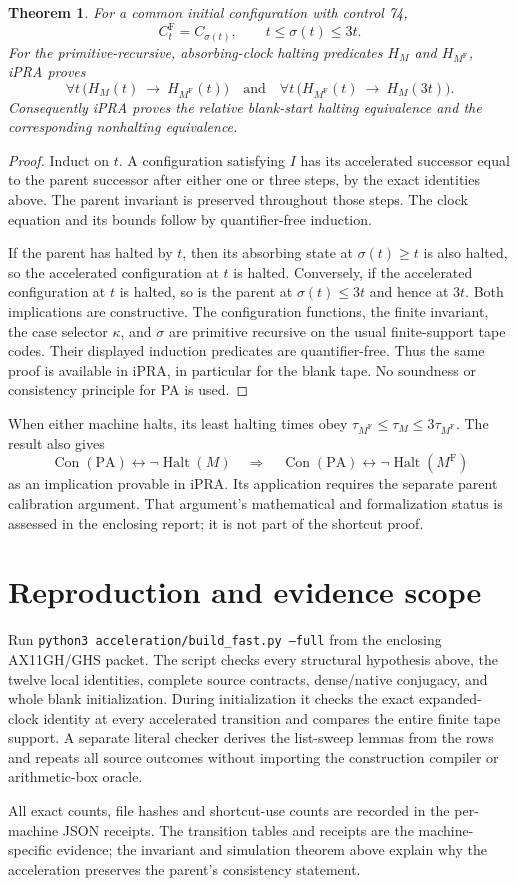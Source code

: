 \documentclass[11pt]{article}
\newtheorem{theorem}{Theorem}
\begin{document}
\begin{theorem}
For a common initial configuration with control 74,
\[
 C_t^{\mathrm F}=C_{\sigma(t)},\qquad
 t\leq\sigma(t)\leq3t.
\]
For the primitive-recursive, absorbing-clock halting predicates $H_M$ and
$H_{M^{\mathrm F}}$, iPRA proves
\[
 \forall t\,\bigl(H_M(t)\ \longrightarrow\ H_{M^{\mathrm F}}(t)\bigr)
 \quad\text{and}\quad
 \forall t\,\bigl(H_{M^{\mathrm F}}(t)\ \longrightarrow\ H_M(3t)\bigr).
\]
Consequently iPRA proves the relative blank-start halting equivalence and
the corresponding nonhalting equivalence.
\end{theorem}
\begin{proof}
Induct on $t$. A configuration satisfying $I$ has its accelerated successor
equal to the parent successor after either one or three steps, by the exact
identities above. The parent invariant is preserved throughout those steps.
The clock equation and its bounds follow by quantifier-free induction.

If the parent has halted by $t$, then its absorbing state at $\sigma(t)\geq t$
is also halted, so the accelerated configuration at $t$ is halted. Conversely,
if the accelerated configuration at $t$ is halted, so is the parent at
$\sigma(t)\leq3t$ and hence at $3t$. Both implications are constructive.
The configuration functions, the finite invariant, the case selector
$\kappa$, and $\sigma$ are primitive recursive on the usual finite-support
tape codes. Their displayed induction predicates are quantifier-free.
Thus the same proof is available in iPRA, in particular for the blank tape.
No soundness or consistency principle for PA is used.
\end{proof}

When either machine halts, its least halting times obey
$\tau_{M^{\mathrm F}}\leq\tau_M\leq3\tau_{M^{\mathrm F}}$.
The result also gives
\[
 \operatorname{Con}(\mathrm{PA})\leftrightarrow\neg\operatorname{Halt}(M)
 \quad\Longrightarrow\quad
 \operatorname{Con}(\mathrm{PA})\leftrightarrow\neg\operatorname{Halt}(M^{\mathrm F})
\]
as an implication provable in iPRA. Its application requires the separate
parent calibration argument. That argument's mathematical and formalization
status is assessed in the enclosing report; it is not part of the shortcut proof.

\section{Reproduction and evidence scope}
Run \texttt{python3 acceleration/build\_fast.py --full} from the enclosing
AX11GH/GHS packet. The script checks every structural hypothesis above,
the twelve local identities, complete source contracts, dense/native
conjugacy, and whole blank initialization. During initialization it checks
the exact expanded-clock identity at every accelerated transition and
compares the entire finite tape support. A separate literal checker derives
the list-sweep lemmas from the rows and repeats all source outcomes without
importing the construction compiler or arithmetic-box oracle.

All exact counts, file hashes and shortcut-use counts are recorded in the
per-machine JSON receipts. The transition tables and receipts are the
machine-specific evidence; the invariant and simulation theorem above
explain why the acceleration preserves the parent's consistency statement.
\end{document}
